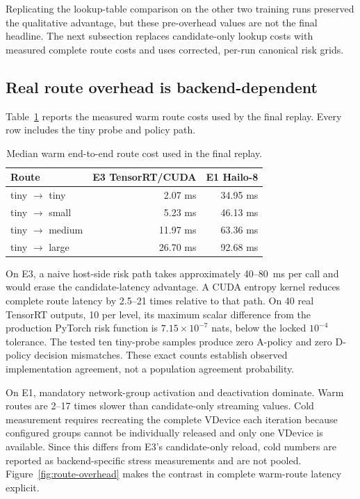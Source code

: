 \documentclass[a4paper,review,12pt]{elsarticle}
\begin{document}
Replicating the lookup-table comparison on the other two training runs preserved the qualitative advantage, but these pre-overhead values are not the final headline. The next subsection replaces candidate-only lookup costs with measured complete route costs and uses corrected, per-run canonical risk grids.

\subsection{Real route overhead is backend-dependent}

Table~\ref{tab:routes} reports the measured warm route costs used by the final replay. Every row includes the tiny probe and policy path.

\begin{table}[t]
\centering
\caption{Median warm end-to-end route cost used in the final replay.}
\label{tab:routes}
\begin{tabular}{@{}lrr@{}}
\toprule
Route & E3 TensorRT/CUDA & E1 Hailo-8 \\
\midrule
tiny $\rightarrow$ tiny & 2.07 ms & 34.95 ms \\
tiny $\rightarrow$ small & 5.23 ms & 46.13 ms \\
tiny $\rightarrow$ medium & 11.97 ms & 63.36 ms \\
tiny $\rightarrow$ large & 26.70 ms & 92.68 ms \\
\bottomrule
\end{tabular}
\end{table}

On E3, a naive host-side risk path takes approximately 40--80~ms per call and would erase the candidate-latency advantage. A CUDA entropy kernel reduces complete route latency by 2.5--21 times relative to that path. On 40 real TensorRT outputs, 10 per level, its maximum scalar difference from the production PyTorch risk function is $7.15\times10^{-7}$ nats, below the locked $10^{-4}$ tolerance. The tested ten tiny-probe samples produce zero A-policy and zero D-policy decision mismatches. These exact counts establish observed implementation agreement, not a population agreement probability.

On E1, mandatory network-group activation and deactivation dominate. Warm routes are 2--17 times slower than candidate-only streaming values. Cold measurement requires recreating the complete VDevice each iteration because configured groups cannot be individually released and only one VDevice is available. Since this differs from E3's candidate-only reload, cold numbers are reported as backend-specific stress measurements and are not pooled. Figure~\ref{fig:route-overhead} makes the contrast in complete warm-route latency explicit.
\end{document}
